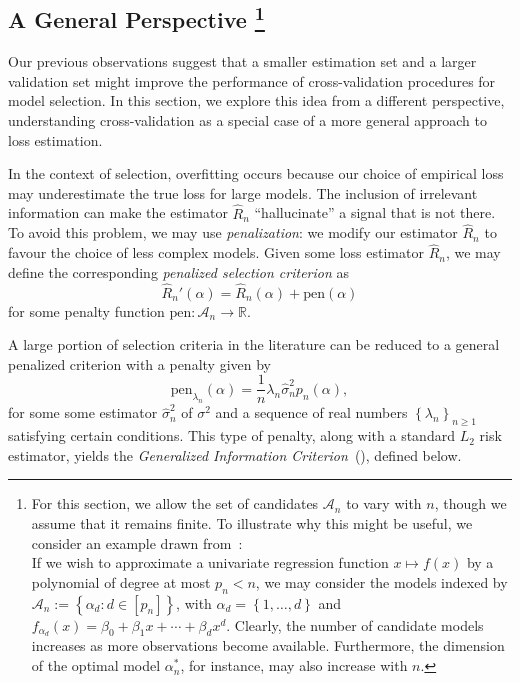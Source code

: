 \documentclass[11pt, letter paper]{article}
\newcommand{\1}{\mathmybb{1}}
\newcommand{\R}{\mathbb{R}}
\newcommand{\0}{\emptyset}
\newcommand{\paren}[1]{\left(#1 \right)}
\newcommand{\set}[1]{\left\{ #1 \right\}}
\newcommand{\Acal}{\mathcal{A}_{n}}
\newcommand{\Tcal}{\mathcal{T}_{n}}
\newcommand{\sigmahat}{\hat{\sigma}^{2}_{n}}
\newcommand{\pen}[1]{\mathrm{pen}\paren{#1}}
\begin{document}
\subsection[A general perspective]{A General Perspective \protect\footnote{For this section, we allow the set of candidates \(\Acal\) to vary with \(n\), though we assume that it remains finite. To illustrate why this might be useful, we consider an example drawn from~\textcite{shao_1997}:\\ \indent If we wish to approximate a univariate regression function \(x\mapsto f(x)\) by a polynomial of degree at most \(p_{n}< n\), we may consider the models indexed by \(\Acal:=\set{\alpha_{d}:d\in[p_n]}\), with \(\alpha_{d} = \set{1,\ldots,d}\) and \(f_{\alpha_{d}}(x) = \beta_{0} + \beta_{1}x + \cdots + \beta_{d}x^{d}\). Clearly, the number of candidate models increases as more observations become available. Furthermore, the dimension of the optimal model \(\alpha^{*}_{n}\), for instance, may also increase with \(n\).}}\label{sec:gic}
\renewcommand{\Acal}{\mathcal{A}_{n}}
\renewcommand{\Tcal}{\mathcal{T}_{n}}

Our previous observations suggest that a smaller estimation set and a larger validation set might improve the performance of cross-validation procedures for model selection. In this section, we explore this idea from a different perspective, understanding cross-validation as a special case of a more general approach to loss estimation.

In the context of selection, overfitting occurs because our choice of empirical loss may underestimate the true loss for large models. The inclusion of irrelevant information can make the estimator \(\hat{R}_{n}\) ``hallucinate'' a signal that is not there. To avoid this problem, we may use \emph{penalization}: we modify our estimator \(\hat{R}_{n}\) to favour the choice of less complex models. Given some loss estimator \(\hat{R}_{n}\), we may define the corresponding \emph{penalized selection criterion} as
\[\hat{R}_{n}'(\alpha) = \hat{R}_{n}(\alpha) + \pen{\alpha}\]
for some penalty function \(\mathrm{pen}:\Acal\to\R\). 

A large portion of selection criteria in the literature can be reduced to a general penalized criterion with a penalty given by 
\[\mathrm{pen}_{\lambda_{n}}(\alpha) = \frac{1}{n} \lambda_{n} \sigmahat p_{n}(\alpha),\]
for some some estimator \(\sigmahat\) of \(\sigma^{2}\) and a sequence of real numbers \(\set{\lambda_{n}}_{n\geq 1}\) satisfying certain conditions. This type of penalty, along with a standard \(L_{2}\) risk estimator, yields the \emph{Generalized Information Criterion}~(\cite{shao_1997}), defined below.
\end{document}
